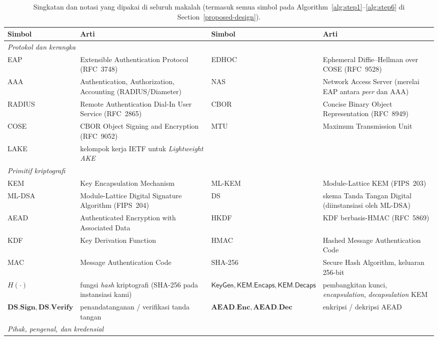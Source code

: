 \documentclass{easychair}
\newcommand{\KemKeyGen}{\mathsf{KeyGen}}
\newcommand{\Encaps}{\mathsf{KEM.Encaps}}
\newcommand{\Decaps}{\mathsf{KEM.Decaps}}
\begin{document}
\begin{table}[h]
\centering
\scriptsize
\caption{Singkatan dan notasi yang dipakai di seluruh makalah
(termasuk semua simbol pada Algorithm~\ref{alg:step1}--\ref{alg:step6}
di Section~\ref{proposed-design}).}
\label{tab:abbr}
\setlength{\tabcolsep}{4pt}
\begin{tabularx}{\linewidth}{@{}l X l X@{}}
\toprule
\textbf{Simbol} & \textbf{Arti} & \textbf{Simbol} & \textbf{Arti} \\
\midrule
\multicolumn{4}{l}{\textit{Protokol dan kerangka}} \\
EAP    & Extensible Authentication Protocol (RFC~3748) & EDHOC  & Ephemeral Diffie--Hellman over COSE (RFC~9528) \\
AAA    & Authentication, Authorization, Accounting (RADIUS/Diameter) & NAS    & Network Access Server (merelai EAP antara \emph{peer} dan AAA) \\
RADIUS & Remote Authentication Dial-In User Service (RFC~2865) & CBOR   & Concise Binary Object Representation (RFC~8949) \\
COSE   & CBOR Object Signing and Encryption (RFC~9052) & MTU    & Maximum Transmission Unit \\
LAKE   & kelompok kerja IETF untuk \emph{Lightweight AKE} & & \\
\midrule
\multicolumn{4}{l}{\textit{Primitif kriptografi}} \\
KEM    & Key Encapsulation Mechanism & ML-KEM & Module-Lattice KEM (FIPS~203) \\
ML-DSA & Module-Lattice Digital Signature Algorithm (FIPS~204) & DS     & skema Tanda Tangan Digital (diinstansiasi oleh ML-DSA) \\
AEAD   & Authenticated Encryption with Associated Data & HKDF   & KDF berbasis-HMAC (RFC~5869) \\
KDF    & Key Derivation Function & HMAC   & Hashed Message Authentication Code \\
MAC    & Message Authentication Code & SHA-256 & Secure Hash Algorithm, keluaran 256-bit \\
$H(\cdot)$ & fungsi \emph{hash} kriptografi (SHA-256 pada instansiasi kami) & $\KemKeyGen,\Encaps,\Decaps$ & pembangkitan kunci, \emph{encapsulation}, \emph{decapsulation} KEM \\
$\mathbf{DS.Sign},\mathbf{DS.Verify}$ & penandatanganan / verifikasi tanda tangan & $\mathbf{AEAD.Enc},\mathbf{AEAD.Dec}$ & enkripsi / dekripsi AEAD \\
\midrule
\multicolumn{4}{l}{\textit{Pihak, pengenal, dan kredensial}} \\

\end{tabularx}
\end{table}
\end{document}
